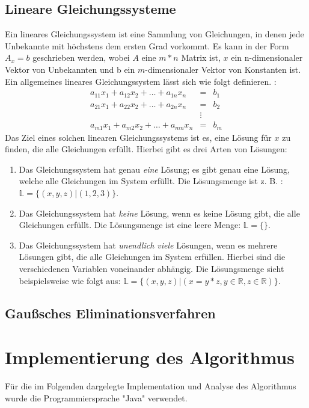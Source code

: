\documentclass[a4paper, 12pt]{report}
\begin{document}
\begin{sloppypar}
\section{Lineare Gleichungssysteme}
Ein lineares Gleichungssystem ist eine Sammlung von Gleichungen, in denen jede Unbekannte mit höchstens dem ersten Grad vorkommt.
Es kann in der Form $ A_x = b $ geschrieben werden, wobei $A$ eine $ m * n $ Matrix ist, $x$ ein n-dimensionaler Vektor von Unbekannten
und b ein $m$-dimensionaler Vektor von Konstanten ist.
Ein allgemeines lineares Gleichungssystem lässt sich wie folgt definieren. :
\begin{eqnarray*}
    a_{11}x_{1}+ a_{12}x_{2}+\hdots+ a_{1n}x_{n} &=& b_1 \\
    a_{21}x_{1}+ a_{22}x_{2}+\hdots+ a_{2n}x_{n} &=& b_2\\
                                                 &\vdots&  \\
    a_{m1}x_{1}+ a_{m2}x_2+\hdots+a_{mn}x_{n} &=& b_{m}
\end{eqnarray*}
\newpage
Das Ziel eines solchen linearen Gleichungssystems ist es, eine Lösung für $x$ zu finden, die alle Gleichungen erfüllt.
Hierbei gibt es drei Arten von Lösungen:
\begin{enumerate}
    \item Das Gleichungssystem hat genau \textit{eine} Lösung; es gibt genau eine Lösung, welche alle Gleichungen im System erfüllt. Die Lösungsmenge ist z. B. : $\mathbb{L} = \{ (x,y,z)| (1,2,3)\} $.
    \item Das Gleichungssystem hat \textit{keine} Lösung, wenn es keine Lösung gibt, die alle Gleichungen erfüllt. Die Lösungsmenge ist eine leere Menge: $\mathbb{L} = \{ \}$.
    \item Das Gleichungssystem hat \textit{unendlich viele} Lösungen, wenn es mehrere Lösungen gibt, die alle Gleichungen im System erfüllen.
        Hierbei sind die verschiedenen Variablen voneinander abhängig. Die Lösungsmenge sieht beispielsweise wie folgt aus: \newline $ \mathbb{L} = \{(x, y, z)| (x = y * z, y\in \mathbb{R}, z \in \mathbb{R}) \} $.
\end{enumerate}


\section{Gaußsches Eliminationsverfahren}
\chapter{Implementierung des Algorithmus}
Für die im Folgenden dargelegte Implementation und Analyse des Algorithmus wurde die Programmiersprache "Java" verwendet.

\end{sloppypar}
\end{document}

